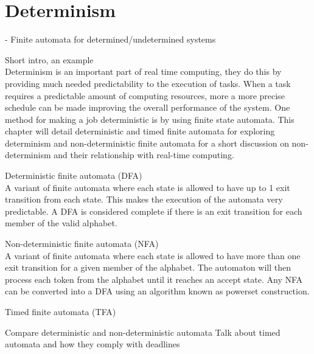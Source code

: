 \section{Determinism} \label{sc:determinism}

- Finite automata for determined/undetermined systems

Short intro, an example\\
Determinism is an important part of real time computing, they do this by providing much needed predictability to the execution of tasks. When a task requires a predictable amount of computing resources, more a more precise schedule can be made improving the overall performance of the system. One method for making a job deterministic is by using finite state automata. This chapter will detail deterministic and timed finite automata for exploring determinism and non-deterministic finite automata for a short discussion on non-determinism and their relationship with real-time computing. \par


Deterministic finite automata (DFA)\\
A variant of finite automata where each state is allowed to have up to 1 exit transition from each state. This makes the execution of the automata very predictable. A DFA is considered complete if there is an exit transition for each member of the valid alphabet. \par


Non-deterministic finite automata (NFA)\\
A variant of finite automata where each state is allowed to have more than one exit transition for a given member of the alphabet. The automaton will then process each token from the alphabet until it reaches an accept state. Any NFA can be converted into a DFA using an algorithm known as powerset construction. \par

Timed finite automata (TFA)


Compare deterministic and non-deterministic automata
Talk about timed automata and how they comply with deadlines

